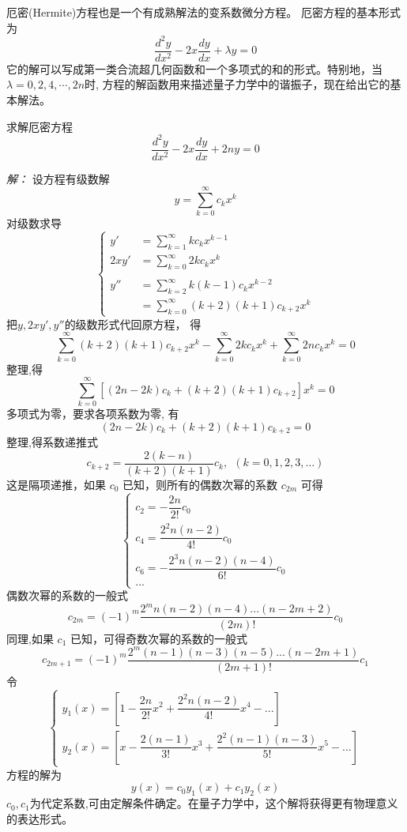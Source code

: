 厄密(Hermite)方程也是一个有成熟解法的变系数微分方程。
厄密方程的基本形式为
\begin{equation}
\frac{d^2 y}{d x^2}-2 x \frac{d y}{d x}+\lambda y=0 
\end{equation}
它的解可以写成第一类合流超几何函数和一个多项式的和的形式。特别地，当 $\lambda=0,2,4,\cdots, 2n$时, 方程的解函数用来描述量子力学中的谐振子，现在给出它的基本解法。
\begin{example} 
	求解厄密方程
\begin{equation}
	\frac{d^2 y}{d x^2} -2x \frac{d y}{d x} +2n y =0
\end{equation}
\end{example}
\emph{解：} 
	设方程有级数解 
$$ y=\sum_{k=0}^{\infty} c_k x^k $$
对级数求导
$$\left\{\begin{aligned}
		y' &= \sum\limits_{k=1}^{\infty} k c_k x^{k-1} \\ 
		2xy'& =\sum\limits_{k=0}^{\infty} 2 k c_k  x^{k}\\
		\\
		y'' &= \sum\limits_{k=2}^{\infty} k (k-1) c_k x^{k-2} \\
		&=  \sum\limits_{k=0}^{\infty} (k+2) (k+1) c_{k+2} x^k
	\end{aligned}\right.$$
把$y, 2xy', y''$的级数形式代回原方程， 得
$$ \sum\limits_{k=0}^{\infty} (k+2) (k+1) c_{k+2} x^k - \sum\limits_{k=0}^{\infty} 2 k c_k  x^{k} + \sum_{k=0}^{\infty} 2n c_k x^k =0 $$
整理,得
	$$ \sum_{k=0}^{\infty} [ (2n -2k)c_k +(k+2)(k+1) c_{k+2}  ] x^k  =0 $$
多项式为零，要求各项系数为零, 有
$$ (2n -2k)c_k +(k+2)(k+1) c_{k+2} =0 $$
整理,得系数递推式
$$ c_{k+2} = \frac{ 2(k-n)}{(k+2)(k+1) } c_k, ~~  \left( k=0,1,2,3, ...  \right)  $$
这是隔项递推，如果 $c_0$ 已知，则所有的偶数次幂的系数 $c_{2m}$ 可得 \\
$$\begin{cases}
		c_2 =- \dfrac{2n}{2!} c_0\\
		c_4 = \dfrac{2^2n(n-2)}{4!} c_0 \\
		c_6 = -\dfrac{2^3n(n-2)(n-4)}{6!} c_0 \\
		...	
\end{cases} $$
偶数次幂的系数的一般式
$$c_{2m} = (-1) ^m \dfrac{2^mn(n-2)(n-4) ... (n-2m+2)  } {(2m)!} c_0$$
同理,如果 $c_1$ 已知，可得奇数次幂的系数的一般式
$$ c_{2m+1} = (-1) ^m \dfrac{2^m (n-1) (n-3)(n-5)...(n-2m+1)  } {(2m+1)!} c_1  $$
令
$$ \begin{cases}
		y_1(x)  = [1- \dfrac{2n}{2!} x^2+ \dfrac{2^2n(n-2)}{4!} x^4 -...  ] \\
		y_2(x)  = [x- \dfrac{2(n-1)}{3!} x^3+ \dfrac{2^2(n-1)(n-3) }{5!}x^5 -...  ]
	\end{cases}$$ 
方程的解为
	$$y(x) =c_0y_1(x)+c_1 y_2(x)$$
$c_0,c_1$为代定系数,可由定解条件确定。在量子力学中，这个解将获得更有物理意义的表达形式。

